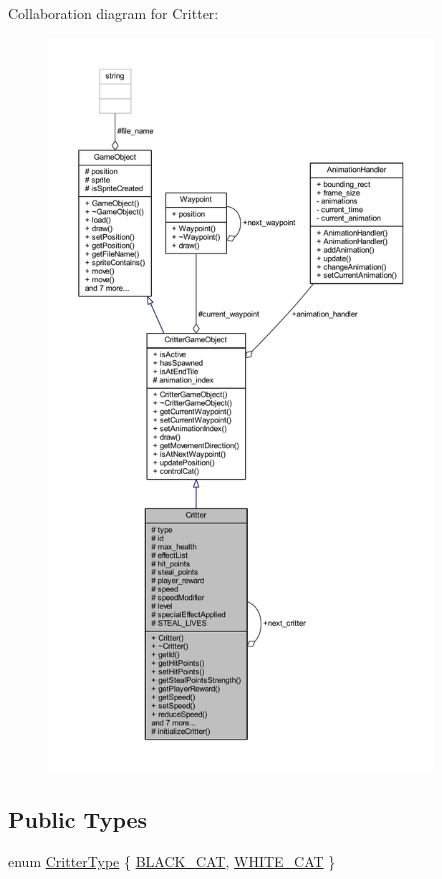 Collaboration diagram for Critter\+:
\nopagebreak
\begin{figure}[H]
\begin{center}
\leavevmode
\includegraphics[height=550pt]{class_critter__coll__graph}
\end{center}
\end{figure}
\subsection*{Public Types}
\begin{DoxyCompactItemize}
\item 
enum \hyperlink{class_critter_acda8a5c3234b66101e0546d75d6f90f1}{Critter\+Type} \{ \hyperlink{class_critter_acda8a5c3234b66101e0546d75d6f90f1a91135fa8da5b64a8a556e8c198b46fe9}{B\+L\+A\+C\+K\+\_\+\+C\+A\+T}, 
\hyperlink{class_critter_acda8a5c3234b66101e0546d75d6f90f1ac88c727edcec187617ee3707d2c193c5}{W\+H\+I\+T\+E\+\_\+\+C\+A\+T}
 \}
\end{DoxyCompactItemize}
